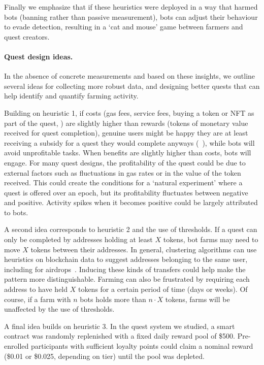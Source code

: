Finally we emphasize that if these heuristics were deployed in a way that harmed bots (\eg banning rather than passive measurement), bots can adjust their behaviour to evade detection, resulting in a `cat and mouse' game between farmers and quest creators. 

\paragraph{Quest design ideas.} In the absence of concrete measurements and based on these insights, we outline several ideas for collecting more robust data, and designing better quests that can help identify and quantify farming activity.

Building on heuristic 1, if costs (\ie gas fees, service fees, buying a token or NFT as part of the quest, \etc) are slightly higher than rewards (\ie tokens of monetary value received for quest completion), genuine users might be happy they are at least receiving a subsidy for a quest they would complete anyways (\cf~\cite{LdM07}), while bots will avoid unprofitable tasks. When benefits are slightly higher than costs, bots will engage. For many quest designs, the profitability of the quest could be due to external factors such as fluctuations in gas rates or in the value of the token received. This could create the conditions for a `natural experiment' where a quest is offered over an epoch, but its profitability fluctuates between negative and positive. Activity spikes when it becomes positive could be largely attributed to bots.

A second idea corresponds to heuristic 2 and the use of thresholds. If a quest can only be completed by addresses holding at least $X$ tokens, bot farms may need to move $X$ tokens between their addresses. In general, clustering algorithms can use heuristics on blockchain data to suggest addresses belonging to the same user, including for airdrops~\cite{FTWC23,ZCH+24}. Inducing these kinds of transfers could help make the pattern more distinguishable. Farming can also be frustrated by requiring each address to have held $X$ tokens for a certain period of time (days or weeks). Of course, if a farm with $n$ bots holds more than $n\cdot X$ tokens, farms will be unaffected by the use of thresholds. 

A final idea builds on heuristic 3. In the quest system we studied, a smart contract was randomly replenished with a fixed daily reward pool of \$500. Pre-enrolled participants with sufficient loyalty points could claim a nominal reward (\$0.01 or \$0.025, depending on tier) until the pool was depleted. 

